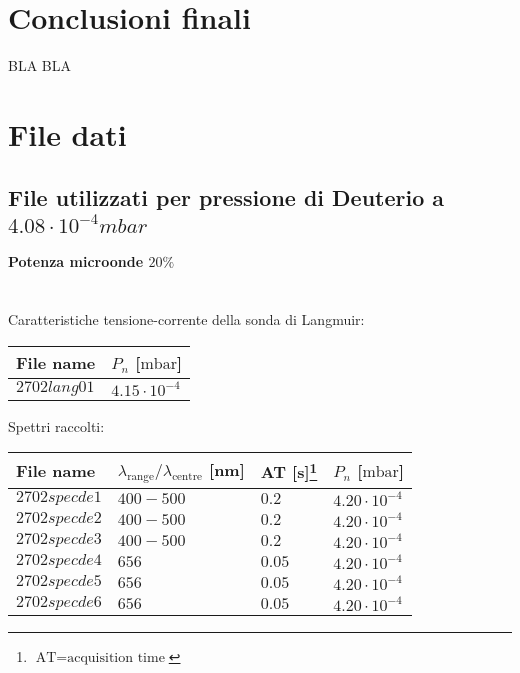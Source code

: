 \section{Conclusioni finali}
BLA BLA

\section{File dati}
\subsection{File utilizzati per pressione di Deuterio a $4.08\cdot10^{-4}mbar$}

\paragraph*{Potenza microonde $\text{20\%}$} ~\\
Caratteristiche tensione-corrente della sonda di Langmuir:
\begin{center}
\begin{tabular}{p{3cm}p{3cm}}
\toprule
File name	&$P_{n}$ [$\si{\milli\bar}$]\\
\midrule
$2702lang01$	&$4.15\cdot10^{-4}$\\
\bottomrule
\end{tabular}
\end{center}

Spettri raccolti:
\begin{center}
\begin{tabular}{p{3cm}p{4cm}p{2cm}p{3cm}}
\toprule
File name	&$\lambda_\text{range}\text{/}\lambda_\text{centre}$ [nm] &AT [s]\footnote{$\text{AT}=\text{acquisition time}$} &$P_{n}$ [$\si{\milli\bar}$]\\
\midrule
$2702specde1$	&$400-500$	&$0.2$		&$4.20\cdot10^{-4}$\\
$2702specde2$	&$400-500$	&$0.2$		&$4.20\cdot10^{-4}$\\
$2702specde3$	&$400-500$	&$0.2$		&$4.20\cdot10^{-4}$\\
$2702specde4$	&$656$		&$0.05$		&$4.20\cdot10^{-4}$\\
$2702specde5$	&$656$		&$0.05$		&$4.20\cdot10^{-4}$\\
$2702specde6$	&$656$		&$0.05$		&$4.20\cdot10^{-4}$\\

\bottomrule
\end{tabular}
\end{center}

